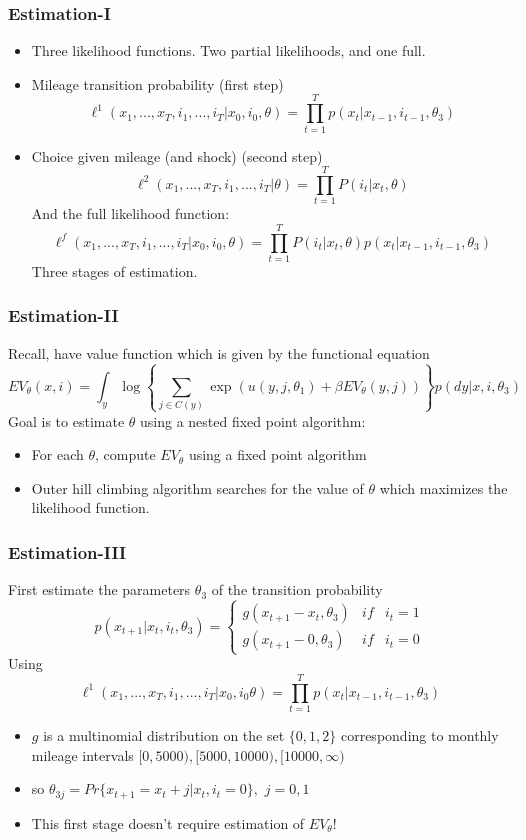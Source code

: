 \documentclass{beamer}
\begin{document}
\begin{frame}
\frametitle{Estimation-I}
\begin{itemize}
\item Three likelihood functions. Two partial likelihoods, and one full.
\bigskip
\item Mileage transition probability (first step)
\[ \ell^1(x_1,{...},x_T,i_1,{...},i_T|x_0,i_0,\theta)=\prod_{t=1}^Tp(x_t|x_{t-1},i_{t-1},\theta_3)\]
\item Choice given mileage (and shock) (second step)
\[\ell^2(x_1,{...},x_{T},i_1,{...},i_T|\theta)=\prod_{t=1}^TP(i_t|x_t,\theta)\]
And the full likelihood function:
\[\ell^f(x_1,{...},x_T,i_1,{...},i_T|x_0,i_0,\theta)=\prod_{t=1}^TP(i_t|x_t,\theta)p(x_t|x_{t-1},i_{t-1},\theta_3)\]
Three stages of estimation.
\end{itemize}
\end{frame}

\begin{frame}
\frametitle{Estimation-II}
Recall, have value function which is given by the functional equation  \[EV_\theta(x,i)=\int_y\log\left\{ \sum_{j\in C(y)}\exp(u(y,j,\theta_1)+\beta EV_\theta (y,j))\right\}p(dy|x,i,\theta_3)\]
Goal is to estimate $\theta$ using a nested fixed point algorithm:
\begin{itemize}
\item For each $\theta$, compute $EV_\theta$ using a fixed point algorithm
\bigskip 
\item Outer hill climbing algorithm searches for the value of $\theta$ which maximizes the likelihood function.
\end{itemize}
\end{frame}

\begin{frame}
\frametitle{Estimation-III}
First estimate the parameters $\theta_3$ of the transition probability \[p(x_{t+1}|x_t,i_t,\theta_3)=\left\{\begin{array}{lll}g(x_{t+1}-x_t,\theta_3)&if&i_t=1\\ g(x_{t+1}-0,\theta_3)&if&i_t=0\end{array}\right.\]
Using\[ \ell^1(x_1,{...},x_T,i_1,{...},i_T|x_0,i_0\theta)=\prod_{t=1}^Tp(x_t|x_{t-1},i_{t-1},\theta_3)\]
\begin{itemize}
\item $g$ is a multinomial distribution on the set $\{0,1,2\}$ corresponding to monthly mileage intervals $[0,5000), [5000,10000), [10000,\infty)$
\bigskip
\item so $\theta_{3j}=Pr\{x_{t+1}=x_t+j|x_t,i_t=0\},$ $j=0,1$ 
\bigskip
\item This first stage doesn't require estimation of $EV_\theta$!
\end{itemize}
\end{frame}
\end{document}
